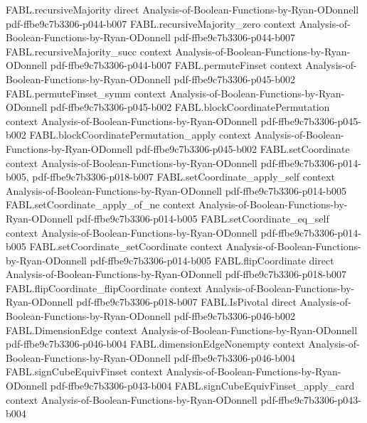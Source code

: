 \begin{theorem}
  {FABL.recursiveMajority}
  {direct}
  {Analysis-of-Boolean-Functions-by-Ryan-ODonnell}
  {pdf-ffbe9c7b3306-p044-b007}
\proofstep
  {FABL.recursiveMajority_zero}
  {context}
  {Analysis-of-Boolean-Functions-by-Ryan-ODonnell}
  {pdf-ffbe9c7b3306-p044-b007}
\proofstep
  {FABL.recursiveMajority_succ}
  {context}
  {Analysis-of-Boolean-Functions-by-Ryan-ODonnell}
  {pdf-ffbe9c7b3306-p044-b007}
\proofstep
  {FABL.permuteFinset}
  {context}
  {Analysis-of-Boolean-Functions-by-Ryan-ODonnell}
  {pdf-ffbe9c7b3306-p045-b002}
\proofstep
  {FABL.permuteFinset_symm}
  {context}
  {Analysis-of-Boolean-Functions-by-Ryan-ODonnell}
  {pdf-ffbe9c7b3306-p045-b002}
\proofstep
  {FABL.blockCoordinatePermutation}
  {context}
  {Analysis-of-Boolean-Functions-by-Ryan-ODonnell}
  {pdf-ffbe9c7b3306-p045-b002}
\proofstep
  {FABL.blockCoordinatePermutation_apply}
  {context}
  {Analysis-of-Boolean-Functions-by-Ryan-ODonnell}
  {pdf-ffbe9c7b3306-p045-b002}
\proofstep
  {FABL.setCoordinate}
  {context}
  {Analysis-of-Boolean-Functions-by-Ryan-ODonnell}
  {pdf-ffbe9c7b3306-p014-b005,
    pdf-ffbe9c7b3306-p018-b007}
\proofstep
  {FABL.setCoordinate_apply_self}
  {context}
  {Analysis-of-Boolean-Functions-by-Ryan-ODonnell}
  {pdf-ffbe9c7b3306-p014-b005}
\proofstep
  {FABL.setCoordinate_apply_of_ne}
  {context}
  {Analysis-of-Boolean-Functions-by-Ryan-ODonnell}
  {pdf-ffbe9c7b3306-p014-b005}
\proofstep
  {FABL.setCoordinate_eq_self}
  {context}
  {Analysis-of-Boolean-Functions-by-Ryan-ODonnell}
  {pdf-ffbe9c7b3306-p014-b005}
\proofstep
  {FABL.setCoordinate_setCoordinate}
  {context}
  {Analysis-of-Boolean-Functions-by-Ryan-ODonnell}
  {pdf-ffbe9c7b3306-p014-b005}
\proofstep
  {FABL.flipCoordinate}
  {direct}
  {Analysis-of-Boolean-Functions-by-Ryan-ODonnell}
  {pdf-ffbe9c7b3306-p018-b007}
\proofstep
  {FABL.flipCoordinate_flipCoordinate}
  {context}
  {Analysis-of-Boolean-Functions-by-Ryan-ODonnell}
  {pdf-ffbe9c7b3306-p018-b007}
\proofstep
  {FABL.IsPivotal}
  {direct}
  {Analysis-of-Boolean-Functions-by-Ryan-ODonnell}
  {pdf-ffbe9c7b3306-p046-b002}
\proofstep
  {FABL.DimensionEdge}
  {context}
  {Analysis-of-Boolean-Functions-by-Ryan-ODonnell}
  {pdf-ffbe9c7b3306-p046-b004}
\proofstep
  {FABL.dimensionEdgeNonempty}
  {context}
  {Analysis-of-Boolean-Functions-by-Ryan-ODonnell}
  {pdf-ffbe9c7b3306-p046-b004}
\proofstep
  {FABL.signCubeEquivFinset}
  {context}
  {Analysis-of-Boolean-Functions-by-Ryan-ODonnell}
  {pdf-ffbe9c7b3306-p043-b004}
\proofstep
  {FABL.signCubeEquivFinset_apply_card}
  {context}
  {Analysis-of-Boolean-Functions-by-Ryan-ODonnell}
  {pdf-ffbe9c7b3306-p043-b004}
\proofstep

\end{theorem}
